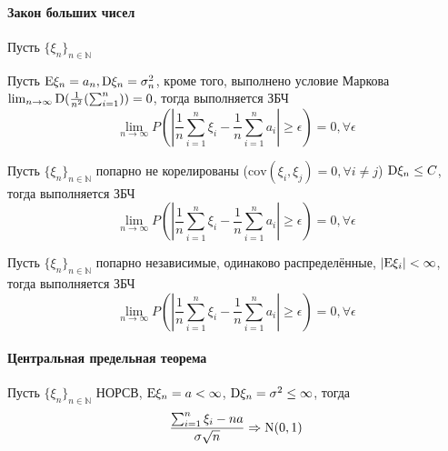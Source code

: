 \documentclass[main.tex]{subfiles}
\begin{document}
\paragraph{Закон больших чисел}
Пусть $\{\xi_n\}_{n\in\mathbb{N}}$
\begin{theorem}
	Пусть $\mathrm{E}\xi_n=a_n,\mathrm{D}\xi_n=\sigma_n^2$, кроме того, выполнено условие Маркова ${\lim_{n\rightarrow\infty}\mathrm{D}(\frac{1}{n^2}(\sum_{i=1}^n)) = 0}$, тогда выполняется ЗБЧ
	$$\lim_{n\rightarrow\infty}P(|\frac{1}{n}\sum_{i=1}^n \xi_i - \frac{1}{n}\sum_{i=1}^n a_i|\geq\epsilon) = 0, \forall \epsilon$$
\end{theorem}

\begin{theorem}
	Пусть $\{\xi_n\}_{n\in\mathbb{N}}$ попарно не корелированы ($\text{cov}(\xi_i,\xi_j)=0,\forall i \neq j$)
	$\mathrm{D}\xi_n \leq C$, тогда выполняется ЗБЧ
	$$\lim_{n\rightarrow\infty}P(|\frac{1}{n}\sum_{i=1}^n \xi_i - \frac{1}{n}\sum_{i=1}^n a_i|\geq\epsilon) = 0, \forall \epsilon$$
\end{theorem}

\begin{theorem}
	Пусть $\{\xi_n\}_{n\in\mathbb{N}}$ попарно независимые, одинаково распределённые, $|\mathrm{E}\xi_i|<\infty$, тогда выполняется ЗБЧ
	$$\lim_{n\rightarrow\infty}P(|\frac{1}{n}\sum_{i=1}^n \xi_i - \frac{1}{n}\sum_{i=1}^n a_i|\geq\epsilon) = 0, \forall \epsilon$$
\end{theorem}

\paragraph{Центральная предельная теорема}
\begin{theorem}
	Пусть $\{\xi_n\}_{n\in\mathbb{N}}$ НОРСВ, $\mathrm{E}\xi_n=a<\infty$, $\mathrm{D}\xi_n=\sigma^2\leq\infty$, тогда 
	$$\frac{\sum_{i=1}^n\xi_i - na}{\sigma\sqrt{n}}\Rightarrow \mathrm{N}(0,1)$$
\end{theorem}
\end{document}
